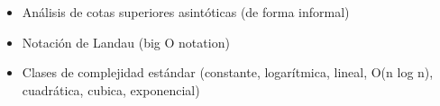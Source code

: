 \begin{itemize}
	\item[\advanced] Análisis de cotas superiores asintóticas (de
    forma informal)
	\item[\advanced] Notación de Landau (big O notation)
	\item[\advanced] Clases de complejidad estándar (constante, logarítmica, lineal, O(n log n), cuadrática, cubica, exponencial)
\end{itemize}


